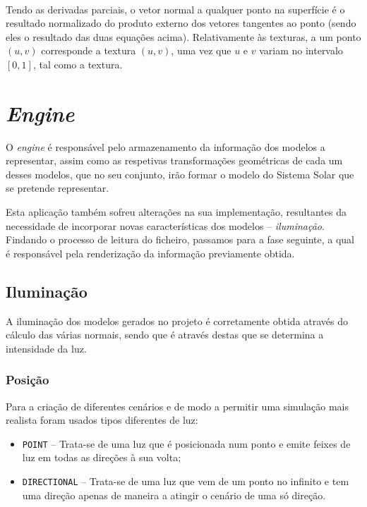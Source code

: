 \documentclass[a4paper, 11pt]{article}
\begin{document}
\

Tendo as derivadas parciais, o vetor normal a qualquer ponto na superfície é o resultado 
normalizado do produto externo dos vetores tangentes ao ponto (sendo eles o resultado das duas 
equações acima). Relativamente às texturas, a um ponto $(u,v)$ corresponde a textura $(u, v)$, 
uma vez que $u$ e $v$ variam no intervalo $\left[ 0, 1 \right]$, tal como a textura.

\pagebreak

\section{\textit{Engine}}

O \textit{engine} é responsável pelo armazenamento da informação dos modelos a representar, 
assim como as respetivas transformações geométricas de cada um desses modelos, que no seu 
conjunto, irão formar o modelo do Sistema Solar que se pretende representar. 

Esta aplicação também sofreu alterações na sua implementação, resultantes da necessidade de 
incorporar novas características dos modelos -- \textit{iluminação}. Findando o processo de 
leitura do ficheiro, passamos para a fase seguinte, a qual é responsável pela renderização da 
informação previamente obtida.

\subsection{Iluminação}

A iluminação dos modelos gerados no projeto é corretamente obtida através do cálculo das 
várias normais, sendo que é através destas que se determina a intensidade da luz.

\subsubsection*{Posição}

Para a criação de diferentes cenários e de modo a permitir uma simulação mais realista foram 
usados tipos diferentes de luz:

\begin{itemize}
    \item \texttt{POINT} -- Trata-se de uma luz que é posicionada num ponto e emite feixes de luz 
em todas as direções à sua volta;
    \item \texttt{DIRECTIONAL} -- Trata-se de uma luz que vem de um ponto no infinito e tem uma 
direção apenas de maneira a atingir o cenário de uma só direção.
\end{itemize}
\end{document}
